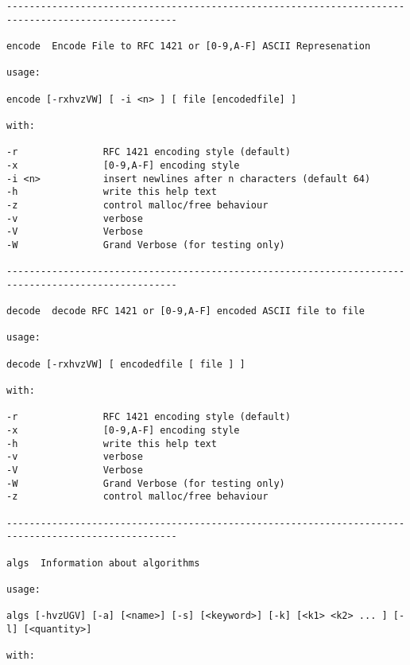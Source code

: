 {\begin{verbatim}
----------------------------------------------------------------------------------------------------

encode  Encode File to RFC 1421 or [0-9,A-F] ASCII Represenation

usage:

encode [-rxhvzVW] [ -i <n> ] [ file [encodedfile] ]

with:

-r               RFC 1421 encoding style (default)
-x               [0-9,A-F] encoding style
-i <n>           insert newlines after n characters (default 64)
-h               write this help text
-z               control malloc/free behaviour
-v               verbose
-V               Verbose
-W               Grand Verbose (for testing only)

----------------------------------------------------------------------------------------------------

decode  decode RFC 1421 or [0-9,A-F] encoded ASCII file to file

usage:

decode [-rxhvzVW] [ encodedfile [ file ] ]

with:

-r               RFC 1421 encoding style (default)
-x               [0-9,A-F] encoding style
-h               write this help text
-v               verbose
-V               Verbose
-W               Grand Verbose (for testing only)
-z               control malloc/free behaviour

----------------------------------------------------------------------------------------------------

algs  Information about algorithms

usage:

algs [-hvzUGV] [-a] [<name>] [-s] [<keyword>] [-k] [<k1> <k2> ... ] [-l] [<quantity>]

with:


\end{verbatim}}
